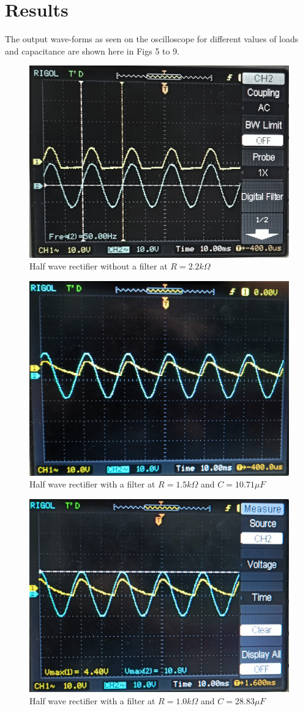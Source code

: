 \section{Results}
The output wave-forms as seen on the oscilloscope for different values of loads and capacitance are shown here in Figs 5 to 9.
\begin{figure}[H]
    \centering
    \includegraphics[width=0.72\columnwidth]{images/00.jpg}
    \caption{Half wave rectifier without a filter at $R = 2.2k\Omega$}
\end{figure}

\begin{figure}[H]
    \centering
    \includegraphics[width=0.72\columnwidth]{images/11.jpg}
    \caption{Half wave rectifier with a filter at $R = 1.5k\Omega$ and $C = 10.71\mu F$}
\end{figure}

\begin{figure}[H]
    \centering
    \includegraphics[width=0.72\columnwidth]{images/21.jpg}
    \caption{Half wave rectifier with a filter at $R = 1.0k\Omega$ and $C = 28.83\mu F$}
\end{figure}


